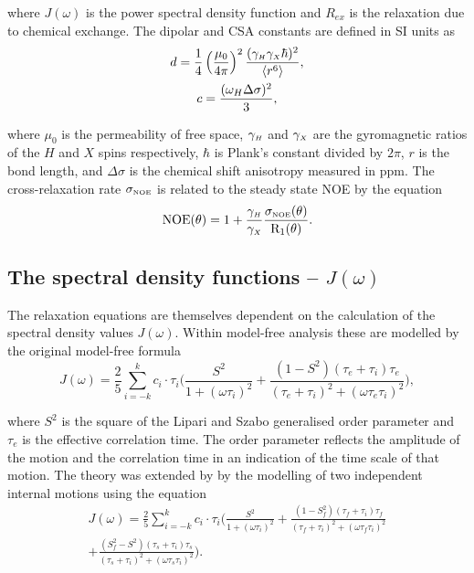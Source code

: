 \noindent where $J(\omega)$ is the power spectral density function and $R_{ex}$ is the relaxation due to chemical exchange.  The dipolar and CSA constants are defined in SI units as
\begin{gather}
 d = \frac{1}{4} \left(\frac{\mu_0}{4\pi}\right)^2 \frac{(\gamma_{\scriptscriptstyle H} \gamma_{\scriptscriptstyle X} \hbar)^2}{\langle r^6 \rangle}, \label{eq: dipolar constant} \\
 c = \frac{(\omega_H \Delta\sigma)^2}{3}, \label{eq: CSA constant}
\end{gather}

\noindent where $\mu_0$ is the permeability of free space, $\gamma_{\scriptscriptstyle H}$ and $\gamma_{\scriptscriptstyle X}$ are the gyromagnetic ratios of the $H$ and $X$ spins respectively, $\hbar$ is Plank's constant divided by $2\pi$, $r$ is the bond length, and $\Delta\sigma$ is the chemical shift anisotropy measured in ppm.  The cross-relaxation rate $\sigma_{\scriptscriptstyle \mathrm{NOE}}$ is related to the steady state NOE by the equation
\begin{equation} \label{eq: NOE}
 \mathrm{NOE}(\theta) = 1 + \frac{\gamma_{\scriptscriptstyle H}}{\gamma_{\scriptscriptstyle X}} \frac{\sigma_{\scriptscriptstyle \mathrm{NOE}}(\theta)}{\mathrm{R}_1(\theta)}.
\end{equation}



\subsection{The spectral density functions -- $J(\omega)$}

The relaxation equations are themselves dependent on the calculation of the spectral density values $J(\omega)$.  Within model-free analysis these are modelled by the original model-free formula \citep{LipariSzabo82a, LipariSzabo82b}
\begin{equation} \label{eq: J(w) model-free generic}
    J(\omega) = \frac{2}{5} \sum_{i=-k}^k c_i \cdot \tau_i \Bigg(
        \frac{S^2}{1 + (\omega \tau_i)^2}
        + \frac{(1 - S^2)(\tau_e + \tau_i)\tau_e}{(\tau_e + \tau_i)^2 + (\omega \tau_e \tau_i)^2}
    \Bigg),
\end{equation}

\noindent where $S^2$ is the square of the Lipari and Szabo generalised order parameter and $\tau_e$ is the effective correlation time.  The order parameter reflects the amplitude of the motion and the correlation time in an indication of the time scale of that motion.  The theory was extended by \citet{Clore90a} by the modelling of two independent internal motions using the equation
\begin{multline} \label{eq: J(w) model-free ext generic}
    J(\omega) = \frac{2}{5} \sum_{i=-k}^k c_i \cdot \tau_i \Bigg(
        \frac{S^2}{1 + (\omega \tau_i)^2}
        + \frac{(1 - S^2_f)(\tau_f + \tau_i)\tau_f}{(\tau_f + \tau_i)^2 + (\omega \tau_f \tau_i)^2}       \\
        + \frac{(S^2_f - S^2)(\tau_s + \tau_i)\tau_s}{(\tau_s + \tau_i)^2 + (\omega \tau_s \tau_i)^2}
    \Bigg).
\end{multline}

